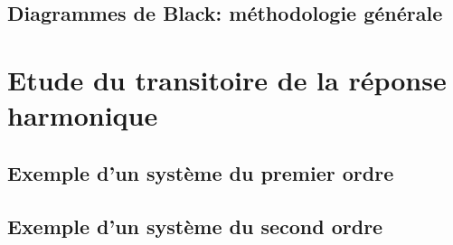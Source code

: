 \subsection{Diagrammes de Black: méthodologie générale}

\section{Etude du transitoire de la réponse harmonique}
\acplhp
\subsection{Exemple d'un système du premier ordre}
\acplhp
\subsection{Exemple d'un système du second ordre}
\acplhp

